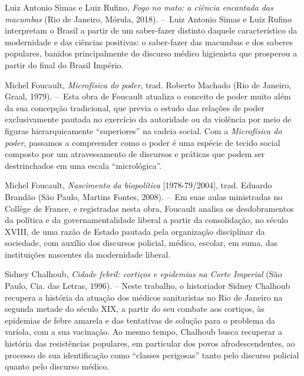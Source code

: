 \documentclass[12pt]{extarticle}
\begin{document}
Luiz Antonio Simas e Luiz Rufino, \emph{Fogo no mato: a ciência
encantada das macumbas} (Rio de Janeiro, Mórula, 2018). --~Luiz Antonio
Simas e Luiz Rufino interpretam o Brasil a partir de um saber-fazer
distinto daquele característico da modernidade e das ciências positivas:
o saber-fazer das macumbas e dos saberes populares, banidos
principalmente do discurso médico higienista que prosperou a partir do
final do Brasil Império.


Michel Foucault, \emph{Microfísica do poder}, trad. Roberto Machado (Rio
de Janeiro, Graal, 1979). --~Esta obra de Foucault atualiza o conceito
de poder muito além da sua concepção tradicional, que previa o estudo
das relações de poder exclusivamente pautada no exercício da autoridade
ou da violência por meio de figuras hierarquicamente ``superiores'' na
cadeia social. Com a \emph{Microfísica do poder}, passamos a compreender
como o poder é uma espécie de tecido social composto por um
atravessamento de discursos e práticas que podem ser destrinchados em
uma escala ``micrológica''.


Michel Foucault, \emph{Nascimento da biopolítica} {[}1978-79/2004{]},
trad. Eduardo Brandão (São Paulo, Martins Fontes, 2008). --~Em suas
aulas ministradas no Collège de France, e registradas nesta obra,
Foucault analisa os desdobramentos da política e da governamentalidade
liberal a partir da consolidação, no século XVIII, de uma razão de
Estado pautada pela organização disciplinar da sociedade, com auxílio
dos discursos policial, médico, escolar, em suma, das instituições
nascentes da modernidade liberal.


Sidney Chalhoub, \emph{Cidade febril: cortiços e epidemias na Corte
Imperial} (São Paulo, Cia. das Letras, 1996). -- Neste trabalho, o
historiador Sidney Chalhoub recupera a história da atuação dos médicos
sanitaristas no Rio de Janeiro na segunda metade do século XIX, a partir
do seu combate aos cortiços, às epidemias de febre amarela e das
tentativas de solução para o problema da varíola, com a sua vacinação.
Ao mesmo tempo, Chalhoub busca recuperar a história das resistências
populares, em particular dos povos afrodescendentes, ao processo de sua
identificação como ``classes perigosas'' tanto pelo discurso policial
quanto pelo discurso médico.
\end{document}
